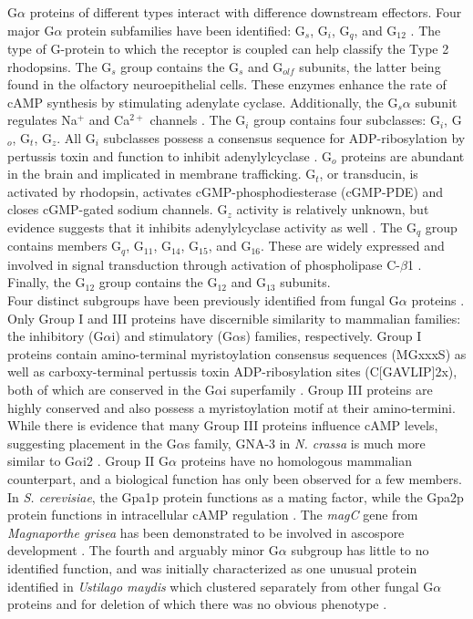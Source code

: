 \indent G$\alpha$ proteins of different types interact with difference downstream effectors. Four 
major G$\alpha$ protein subfamilies have been identified: G$_{s}$, G$_{i}$, G$_{q}$, and G$_{12}$ 
\cite{Hepler1992}. The type of G-protein to which the receptor is coupled can help classify the Type 2 
rhodopsins. The G$_{s}$ group contains the G$_{s}$ and G$_{olf}$  subunits, the latter being found 
in the olfactory neuroepithelial cells. These enzymes enhance the rate of cAMP synthesis by 
stimulating adenylate cyclase. Additionally, the G$_{s}\alpha$ subunit regulates Na$^{+}$ and 
Ca$^{2+}$ channels \cite{Hepler1992}. The G$_{i}$ group contains four subclasses: G$_{i}$, 
G$_{o}$, G$_{t}$, G$_{z}$. All G$_{i}$ subclasses possess a consensus sequence for 
ADP-ribosylation by pertussis toxin and function to inhibit adenylylcyclase \cite{KABMycotaIII}. 
G$_{o}$ proteins are abundant in the brain and implicated in membrane trafficking. 
G$_{t}$, or transducin, is activated by rhodopsin, activates cGMP-phosphodiesterase (cGMP-PDE) 
and closes cGMP-gated sodium channels. G$_{z}$ activity is relatively unknown, 
but evidence suggests that it inhibits adenylylcyclase activity as well \cite{KABMycotaIII}. 
The G$_{q}$ group contains members G$_{q}$, G$_{11}$, G$_{14}$, G$_{15}$, and G$_{16}$. 
These are widely expressed and involved in signal transduction through activation of phospholipase C-$\beta$1 \cite{KABMycotaIII}. 
Finally, the G$_{12}$ group contains the G$_{12}$ and G$_{13}$ subunits.\\
\indent Four distinct subgroups have been previously identified from fungal G$\alpha$ proteins \cite{Bolker1998}. Only Group I and III proteins have discernible similarity to mammalian families: the inhibitory (G$\alpha$i) and stimulatory (G$\alpha$s) families, respectively. Group I proteins contain amino-terminal myristoylation consensus sequences (MGxxxS) as well as carboxy-terminal pertussis toxin ADP-ribosylation sites (C[GAVLIP]{2}x), both of which are conserved in the G$\alpha$i superfamily \cite{Li2007}. Group III proteins are highly conserved and also possess a myristoylation motif at their amino-termini. While there is evidence that many Group III proteins influence cAMP levels, suggesting placement in the G$\alpha$s family, GNA-3 in \textit{N. crassa} is much more similar to G$\alpha$i2 \cite{Li2007}. Group II G$\alpha$ proteins have no homologous mammalian counterpart, and a biological function has only been observed for a few members. In \textit{S. cerevisiae}, the Gpa1p protein functions as a mating factor, while the Gpa2p protein functions in intracellular cAMP regulation \cite{KABMycotaIII}. The \textit{magC} gene from \textit{Magnaporthe grisea} has been demonstrated to be involved in ascospore development \cite{Liu1997}. The fourth and arguably minor G$\alpha$ subgroup has little to no identified function, and was initially characterized as one unusual protein identified in \textit{Ustilago maydis} which clustered separately from other fungal G$\alpha$ proteins and for deletion of which there was no obvious phenotype \cite{Bolker1998}.\\
